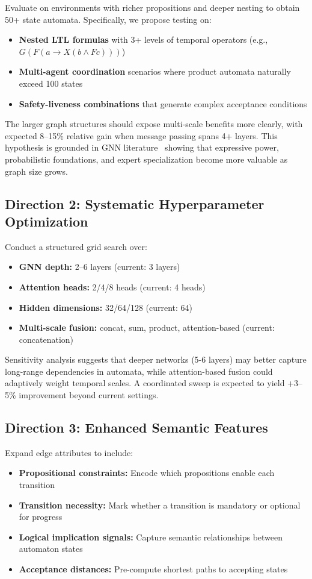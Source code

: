 \documentclass[journal]{IEEEtran}
\begin{document}
Evaluate on environments with richer propositions and deeper nesting to obtain 50+ state automata. Specifically, we propose testing on:
\begin{itemize}
\item \textbf{Nested LTL formulas} with 3+ levels of temporal operators (e.g., $G(F(a \rightarrow X(b \land F c)))$)
\item \textbf{Multi-agent coordination} scenarios where product automata naturally exceed 100 states
\item \textbf{Safety-liveness combinations} that generate complex acceptance conditions
\end{itemize}

The larger graph structures should expose multi-scale benefits more clearly, with expected 8--15\% relative gain when message passing spans 4+ layers. This hypothesis is grounded in GNN literature~\citep{Kipf2017,wang2023graph,murphy2018machine} showing that expressive power, probabilistic foundations, and expert specialization become more valuable as graph size grows.

\subsection{Direction 2: Systematic Hyperparameter Optimization}

Conduct a structured grid search over:
\begin{itemize}
\item \textbf{GNN depth:} 2--6 layers (current: 3 layers)
\item \textbf{Attention heads:} 2/4/8 heads (current: 4 heads)
\item \textbf{Hidden dimensions:} 32/64/128 (current: 64)
\item \textbf{Multi-scale fusion:} concat, sum, product, attention-based (current: concatenation)
\end{itemize}

Sensitivity analysis suggests that deeper networks (5-6 layers) may better capture long-range dependencies in automata, while attention-based fusion could adaptively weight temporal scales. A coordinated sweep is expected to yield +3--5\% improvement beyond current settings.

\subsection{Direction 3: Enhanced Semantic Features}

Expand edge attributes to include:
\begin{itemize}
\item \textbf{Propositional constraints:} Encode which propositions enable each transition
\item \textbf{Transition necessity:} Mark whether a transition is mandatory or optional for progress
\item \textbf{Logical implication signals:} Capture semantic relationships between automaton states
\item \textbf{Acceptance distances:} Pre-compute shortest paths to accepting states
\end{itemize}
\end{document}
